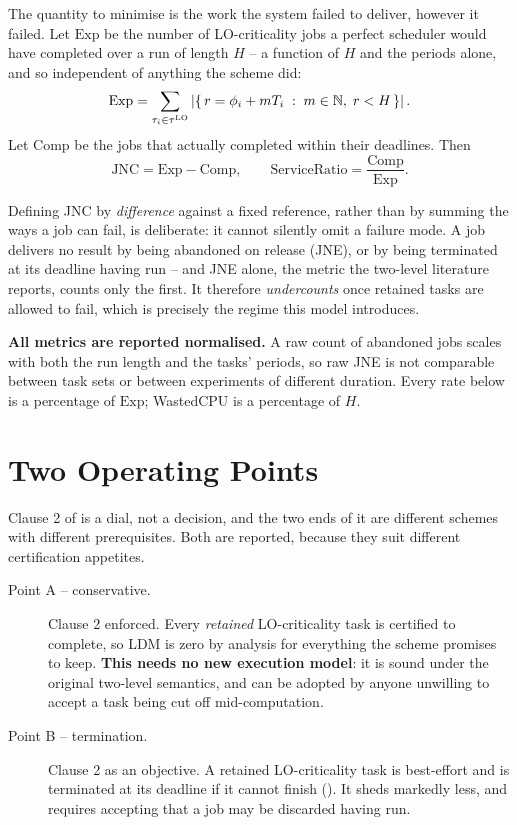 \documentclass{article}
\begin{document}
The quantity to minimise is the work the system failed to deliver, however it
failed. Let $\mathrm{Exp}$ be the number of LO-criticality jobs a perfect
scheduler would have completed over a run of length $H$ -- a function of $H$
and the periods alone, and so independent of anything the scheme did:
\[
\mathrm{Exp} = \sum_{\tau_i \in \tau^{\mathrm{LO}}} \left| \{\, r = \phi_i + m T_i \;:\; m \in \mathbb{N},\; r < H \,\} \right| .
\]
Let $\mathrm{Comp}$ be the jobs that actually completed within their deadlines.
Then
\[
\mathrm{JNC} = \mathrm{Exp} - \mathrm{Comp},
\qquad
\mathrm{ServiceRatio} = \frac{\mathrm{Comp}}{\mathrm{Exp}} .
\]

Defining JNC by \emph{difference} against a fixed reference, rather than by
summing the ways a job can fail, is deliberate: it cannot silently omit a
failure mode. A job delivers no result by being abandoned on release (JNE), or
by being terminated at its deadline having run -- and JNE alone, the metric the
two-level literature reports, counts only the first. It therefore
\emph{undercounts} once retained tasks are allowed to fail, which is precisely
the regime this model introduces.

\textbf{All metrics are reported normalised.} A raw count of abandoned jobs
scales with both the run length and the tasks' periods, so raw JNE is not
comparable between task sets or between experiments of different duration.
Every rate below is a percentage of $\mathrm{Exp}$; WastedCPU is a percentage
of $H$.

\section{Two Operating Points}
\label{sec:operating-points}

Clause 2 of  is a dial, not a decision, and the two
ends of it are different schemes with different prerequisites. Both are
reported, because they suit different certification appetites.

\begin{description}
\item[Point A -- conservative.] Clause 2 enforced. Every \emph{retained}
  LO-criticality task is certified to complete, so LDM is zero by analysis for
  everything the scheme promises to keep. \textbf{This needs no new execution
  model}: it is sound under the original two-level semantics, and can be
  adopted by anyone unwilling to accept a task being cut off mid-computation.
\item[Point B -- termination.] Clause 2 as an objective. A retained
  LO-criticality task is best-effort and is terminated at its deadline if it
  cannot finish (). It sheds markedly less, and requires
  accepting that a job may be discarded having run.
\end{description}
\end{document}

